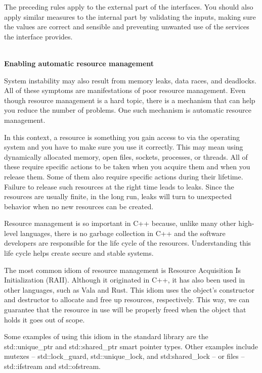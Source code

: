The preceding rules apply to the external part of the interfaces. You should also apply similar measures to the internal part by validating the inputs, making sure the values are correct and sensible and preventing unwanted use of the services the interface provides.

\hspace*{\fill} \\ %
\noindent
\textbf{Enabling automatic resource management}

System instability may also result from memory leaks, data races, and deadlocks. All of these symptoms are manifestations of poor resource management. Even though resource management is a hard topic, there is a mechanism that can help you reduce the number of problems. One such mechanism is automatic resource management.

In this context, a resource is something you gain access to via the operating system and you have to make sure you use it correctly. This may mean using dynamically allocated memory, open files, sockets, processes, or threads. All of these require specific actions to be taken when you acquire them and when you release them. Some of them also require specific actions during their lifetime. Failure to release such resources at the right time leads to leaks. Since the resources are usually finite, in the long run, leaks will turn to unexpected behavior when no new resources can be created. 

Resource management is so important in C++ because, unlike many other high-level languages, there is no garbage collection in C++ and the software developers are responsible for the life cycle of the resources. Understanding this life cycle helps create secure and stable systems.

The most common idiom of resource management is Resource Acquisition Is Initialization (RAII). Although it originated in C++, it has also been used in other languages, such as Vala and Rust. This idiom uses the object's constructor and destructor to allocate and free up resources, respectively. This way, we can guarantee that the resource in use will be properly freed when the object that holds it goes out of scope.

Some examples of using this idiom in the standard library are the std::unique\_ptr and std::shared\_ptr smart pointer types. Other examples include mutexes – std::lock\_guard, std::unique\_lock, and std:shared\_lock – or files – std::ifstream and std::ofstream.

